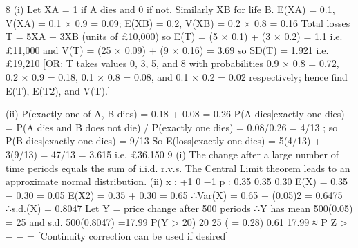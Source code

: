 \documentclass[a4paper,12pt]{article}
\begin{document}
8 (i) Let XA = 1 if A dies and 0 if not. Similarly XB for life B.
E(XA) = 0.1, V(XA) = 0.1 × 0.9 = 0.09;
E(XB) = 0.2, V(XB) = 0.2 × 0.8 = 0.16
Total losses T = 5XA + 3XB (units of £10,000)
so E(T) = (5 × 0.1) + (3 × 0.2) = 1.1 i.e. £11,000
and V(T) = (25 × 0.09) + (9 × 0.16) = 3.69 so SD(T) = 1.921
i.e. £19,210
[OR: T takes values 0, 3, 5, and 8 with probabilities 0.9 × 0.8 = 0.72, 0.2 ×
0.9 = 0.18, 0.1 × 0.8 = 0.08, and 0.1 × 0.2 = 0.02 respectively; hence find
E(T), E(T2), and V(T).]

(ii) P(exactly one of A, B dies) = 0.18 + 0.08 = 0.26
P(A dies|exactly one dies) = P(A dies and B does not die) / P(exactly one dies)
= 0.08/0.26 = 4/13 ; so P(B dies|exactly one dies) = 9/13
So E(loss|exactly one dies) = 5(4/13) + 3(9/13) = 47/13 = 3.615
i.e. £36,150
9 (i) The change after a large number of time periods equals the sum of i.i.d.
r.v.s.
The Central Limit theorem leads to an approximate normal distribution.
(ii)
x : +1 0 −1
p : 0.35 0.35 0.30
E(X) = 0.35 − 0.30 = 0.05
E(X2) = 0.35 + 0.30 = 0.65
∴Var(X) = 0.65 − (0.05)2 = 0.6475 ∴s.d.(X) = 0.8047
Let Y = price change after 500 periods
∴Y has mean 500(0.05) = 25 and s.d. 500(0.8047) =17.99
P(Y > 20)
20 25
( = 0.28) 0.61
17.99
≈ P Z > − − =
[Continuity correction can be used if desired]
\end{document}
